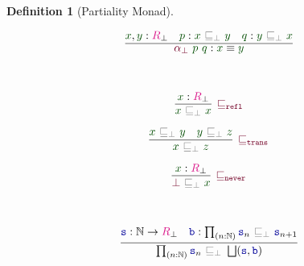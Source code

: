 \documentclass[twoside,11pt,openright]{report}
\theoremstyle{plain} %
\theoremstyle{definition}
\newtheorem{defn}{Definition}[section]
\theoremstyle{remark}
\newcommand*{\term}[1]{\textcolor{green!30!black}{#1}} %
\newcommand*{\type}[1]{\textcolor{magenta!90!black}{#1}}
\newcommand*{\relation}[1]{\textcolor{gray}{\ensuremath{\mathtt{#1}}}}
\newcommand*{\function}[1]{\textcolor{blue!60!black}{\ensuremath{\mathtt{#1}}}}
\newcommand*{\constructor}[1]{\textcolor{purple!60!black}{\ensuremath{\mathtt{#1}}}}
\begin{document}
\begin{defn}[Partiality Monad]
\begin{center}
    \hfill
    \begin{minipage}{0.45\linewidth}
      \begin{equation}
        \infer{\constructor{\alpha_{\bot}}~\term{p}~\term{q} : \term{x} \equiv \term{y}}{\term{x},\term{y} : \type{R}_\bot & \term{p} : \term{x}~\relation{\sqsubseteq_{\bot}}~\term{y} & \term{q} : \term{y}~\relation{\sqsubseteq_{\bot}}~\term{x}}
      \end{equation}
    \end{minipage}
  \end{center}
  \strut\\[-15mm]
  \begin{center}
    \begin{minipage}{0.25\linewidth}
      \begin{equation}
        \infer[\constructor{\sqsubseteq_{refl}}]{\term{x}~\relation{\sqsubseteq_{\bot}}~\term{x}}{\term{x} : \type{R}_\bot}
      \end{equation}
    \end{minipage}
    \hfill
    \begin{minipage}{0.35\linewidth}
      \begin{equation}
        \infer[\constructor{\sqsubseteq_{trans}}]{\term{x}~\relation{\sqsubseteq_{\bot}}~\term{z}}{\term{x}~\relation{\sqsubseteq_{\bot}}~\term{y} & \term{y}~\relation{\sqsubseteq_{\bot}}~\term{z}}
      \end{equation}
    \end{minipage}
    \hfill
    \begin{minipage}{0.25\linewidth}
      \begin{equation}
        \infer[\constructor{\sqsubseteq_{never}}]{\constructor{\bot}~\relation{\sqsubseteq_{\bot}}~\term{x}}{\term{x} : \type{R}_\bot}
      \end{equation}
    \end{minipage}
  \end{center}
  \strut\\[-15mm]
  \begin{center}
    \hfill
    \begin{minipage}{0.50\linewidth}
      \begin{equation}
        \infer{\prod_{(n : \mathbb{N})} \function{s}_n~\relation{\sqsubseteq_{\bot}}~\bigsqcup(\function{s},\function{b})}{\function{s} : \mathbb{N} \rightarrow \type{R}_\bot & \function{b} : \prod_{(n : \mathbb{N})} \function{s}_n~\relation{\sqsubseteq_{\bot}}~\function{s}_{n+1} }
      \end{equation}

\end{minipage}
\end{center}
\end{defn}
\end{document}
